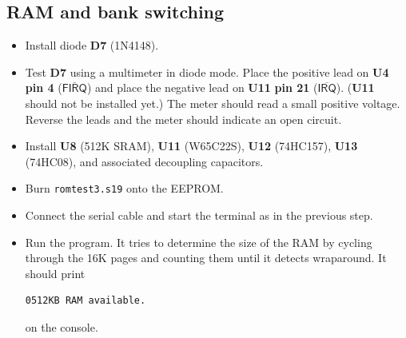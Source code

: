 \documentclass[letterpaper,11pt]{article}
\newcommand{\Net}[1]{\ensuremath{\overline{\textsf{#1}}}}
\newcommand{\pin}[1]{\textbf{pin #1}}
\newcommand{\rNpin}[3]{\refdes{#1} \pin{#2} (\Net{#3})}
\newcommand{\refdes}[1]{\textbf{#1}}
\begin{document}
\subsection{RAM and bank switching}
\begin{itemize}
\item Install diode \refdes{D7} (1N4148).
\item Test \refdes{D7} using a multimeter in diode mode. Place the positive lead on \rNpin{U4}{4}{FIRQ} and place the negative lead on \rNpin{U11}{21}{IRQ}. (\refdes{U11} should not be installed yet.) The meter should read a small positive voltage. Reverse the leads and the meter should indicate an open circuit.
\item Install \refdes{U8} (512K SRAM), \refdes{U11} (W65C22S), \refdes{U12} (74HC157), \refdes{U13} (74HC08), and associated decoupling capacitors.
\item Burn \texttt{romtest3.s19} onto the EEPROM.
\item Connect the serial cable and start the terminal as in the previous step.
\item Run the program. It tries to determine the size of the RAM by cycling through the 16K pages and counting them until it detects wraparound. It should print
\begin{verbatim}
0512KB RAM available.
\end{verbatim}
on the console.
\end{itemize}
\end{document}
